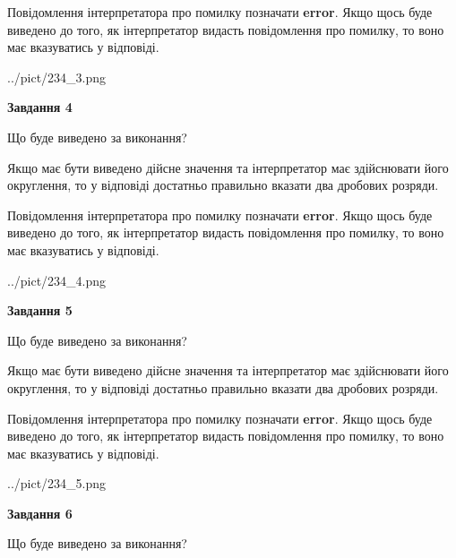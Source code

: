 \documentclass[12pt, ukrainian]{article}
\begin{document}
{\begin {Large}
Повідомлення інтерпретатора про помилку позначати \textbf{error}.
Якщо щось буде виведено до того, як інтерпретатор видасть повідомлення про помилку, 
то воно має вказуватись у відповіді. \par

\begin{center}
	{../pict/234_3.png}
\end{center}
\newpage

{\begin {center}\textbf{Завдання 4}\end {center}}\par
Що буде виведено за виконання? \par

Якщо має бути виведено дійсне значення та інтерпретатор має здійснювати його округлення, 
то у відповіді достатньо правильно вказати два дробових розряди.

Повідомлення інтерпретатора про помилку позначати \textbf{error}.
Якщо щось буде виведено до того, як інтерпретатор видасть повідомлення про помилку, 
то воно має вказуватись у відповіді. \par

\begin{center}
	{../pict/234_4.png}
\end{center}
\newpage

{\begin {center}\textbf{Завдання 5}\end {center}}\par
Що буде виведено за виконання? \par

Якщо має бути виведено дійсне значення та інтерпретатор має здійснювати його округлення, 
то у відповіді достатньо правильно вказати два дробових розряди.

Повідомлення інтерпретатора про помилку позначати \textbf{error}.
Якщо щось буде виведено до того, як інтерпретатор видасть повідомлення про помилку, 
то воно має вказуватись у відповіді. \par

\begin{center}
	{../pict/234_5.png}
\end{center}
\newpage

{\begin {center}\textbf{Завдання 6}\end {center}}\par
Що буде виведено за виконання? \par


\end{Large}}
\end{document}
